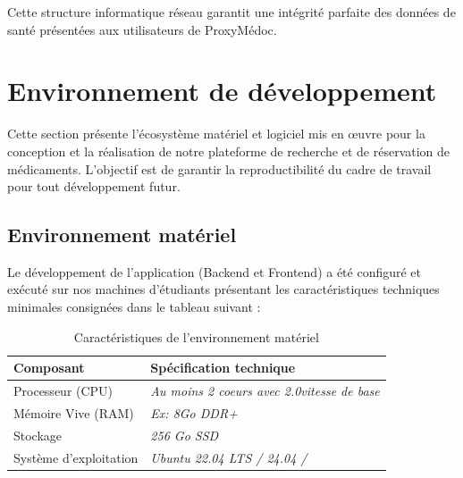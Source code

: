 \documentclass[12pt,a4paper]{report}
\begin{document}
	Cette structure informatique réseau garantit une intégrité parfaite des données de santé présentées aux utilisateurs de ProxyMédoc. %
	
	\chapter{Environnement de développement}
	Cette section présente l'écosystème matériel et logiciel mis en œuvre pour la conception et la réalisation de notre plateforme de recherche et de réservation de médicaments. L'objectif est de garantir la reproductibilité du cadre de travail pour tout développement futur.
	
	\section{Environnement matériel}
	Le développement de l'application (Backend et Frontend) a été configuré et exécuté sur nos machines d'étudiants présentant les caractéristiques techniques minimales consignées dans le tableau suivant :
	
	\begin{table}[h!]
		\centering
		\begin{tabular}{ll}
			\toprule
			\textbf{Composant} & \textbf{Spécification technique} \\
			\midrule
			Processeur (CPU) & \textit{ Au moins 2 coeurs avec 2.0vitesse de base}\\
			Mémoire Vive (RAM) & \textit{Ex: 8Go DDR+} \\
			Stockage & \textit{ 256 Go SSD} \\
			Système d'exploitation & \textit{Ubuntu 22.04 LTS / 24.04 / } \\
			\bottomrule
		\end{tabular}
        \caption{Caractéristiques de l'environnement matériel}
	\end{table}
	
\end{document}
